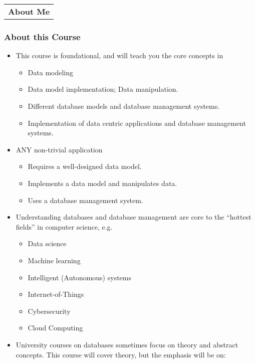 \documentclass[11pt]{article}
\providecommand{\tightlist}{%
      \setlength{\itemsep}{0pt}\setlength{\parskip}{0pt}}
\begin{document}
    \begin{longtable}[]{@{}c@{}}
\toprule
\tabularnewline
\midrule
\endhead
\textbf{About Me}\tabularnewline
\bottomrule
\end{longtable}

    \subsubsection{About this Course}\label{about-this-course}

\begin{itemize}
\tightlist
\item
  This course is foundational, and will teach you the core concepts in

  \begin{itemize}
  \tightlist
  \item
    Data modeling
  \item
    Data model implementation; Data manipulation.
  \item
    Different database models and database management systems.
  \item
    Implementation of data centric applications and database management
    systems.
  \end{itemize}
\item
  ANY non-trivial application

  \begin{itemize}
  \tightlist
  \item
    Requires a well-designed data model.
  \item
    Implements a data model and manipulates data.
  \item
    Uses a database management system.
  \end{itemize}
\item
  Understanding databases and database management are core to the
  ``hottest fields'' in computer science, e.g.

  \begin{itemize}
  \tightlist
  \item
    Data science
  \item
    Machine learning
  \item
    Intelligent (Autonomous) systems
  \item
    Internet-of-Things
  \item
    Cybersecurity
  \item
    Cloud Computing
  \end{itemize}
\item
  University courses on databases sometimes focus on theory and abstract
  concepts. This course will cover theory, but the emphasis will be on:


\end{itemize}
\end{document}
